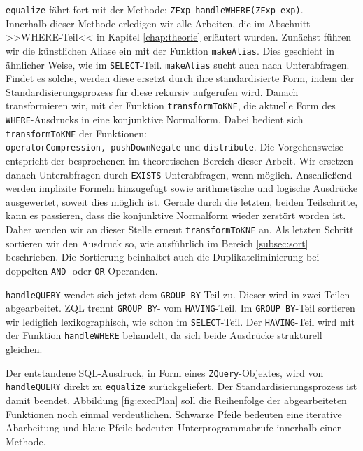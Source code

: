 \verb|equalize| fährt fort mit der Methode: \verb|ZExp handleWHERE(ZExp exp)|.\\
Innerhalb dieser Methode erledigen wir alle Arbeiten, die im Abschnitt >>WHERE-Teil<< in Kapitel \ref{chap:theorie} erläutert wurden. Zunächst führen wir die künstlichen Aliase ein mit der Funktion \verb|makeAlias|. Dies geschieht in ähnlicher Weise, wie im \verb|SELECT|-Teil. \verb|makeAlias| sucht auch nach Unterabfragen. Findet es solche, werden diese ersetzt durch ihre standardisierte Form, indem der Standardisierungsprozess für diese rekursiv aufgerufen wird. Danach transformieren wir, mit der Funktion \verb|transformToKNF|, die aktuelle Form des \verb|WHERE|-Ausdrucks in eine konjunktive Normalform. Dabei bedient sich \verb|transformToKNF| der Funktionen:\\
\verb|operatorCompression, pushDownNegate| und \verb|distribute|. Die Vorgehensweise entspricht der besprochenen im theoretischen Bereich dieser Arbeit. Wir ersetzen danach Unterabfragen durch \verb|EXISTS|-Unterabfragen, wenn möglich. Anschließend werden implizite Formeln hinzugefügt sowie arithmetische und logische Ausdrücke ausgewertet, soweit dies möglich ist. Gerade durch die letzten, beiden Teilschritte, kann es passieren, dass die konjunktive Normalform wieder zerstört worden ist. Daher wenden wir an dieser Stelle erneut \verb|transformToKNF| an. Als letzten Schritt sortieren wir den Ausdruck so, wie ausführlich im Bereich \ref{subsec:sort} beschrieben. Die Sortierung beinhaltet auch die Duplikateliminierung bei doppelten \verb|AND|- oder \verb|OR|-Operanden.

\verb|handleQUERY| wendet sich jetzt dem \verb|GROUP BY|-Teil zu. Dieser wird in zwei Teilen abgearbeitet. ZQL trennt \verb|GROUP BY|- vom \verb|HAVING|-Teil. Im \verb|GROUP BY|-Teil sortieren wir lediglich lexikographisch, wie schon im \verb|SELECT|-Teil. Der \verb|HAVING|-Teil wird mit der Funktion \verb|handleWHERE| behandelt, da sich beide Ausdrücke strukturell gleichen.

Der entstandene SQL-Ausdruck, in Form eines \verb|ZQuery|-Objektes, wird von \verb|handleQUERY| direkt zu \verb|equalize| zurückgeliefert. Der Standardisierungsprozess ist damit beendet. Abbildung \ref{fig:execPlan} soll die Reihenfolge der abgearbeiteten Funktionen noch einmal verdeutlichen. Schwarze Pfeile bedeuten eine iterative Abarbeitung und blaue Pfeile bedeuten Unterprogrammabrufe innerhalb einer Methode.

